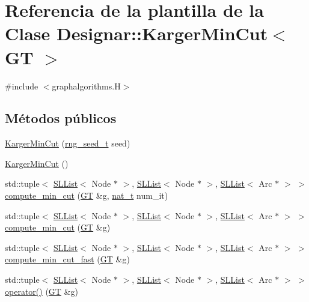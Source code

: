 \hypertarget{class_designar_1_1_karger_min_cut}{}\section{Referencia de la plantilla de la Clase Designar\+:\+:Karger\+Min\+Cut$<$ GT $>$}
\label{class_designar_1_1_karger_min_cut}


{\ttfamily \#include $<$graphalgorithms.\+H$>$}

\subsection*{Métodos públicos}
\begin{DoxyCompactItemize}
\item 
\hyperlink{class_designar_1_1_karger_min_cut_ab2b55a4d8b0d64a469cecafeeac8fcf1}{Karger\+Min\+Cut} (\hyperlink{namespace_designar_ad621b5646d45288c5d6a1e1dfe7531a8}{rng\+\_\+seed\+\_\+t} seed)
\item 
\hyperlink{class_designar_1_1_karger_min_cut_a1f8bce9bd104fb9b6ba7744c58dbf68b}{Karger\+Min\+Cut} ()
\item 
std\+::tuple$<$ \hyperlink{class_designar_1_1_s_l_list}{S\+L\+List}$<$ Node $\ast$ $>$, \hyperlink{class_designar_1_1_s_l_list}{S\+L\+List}$<$ Node $\ast$ $>$, \hyperlink{class_designar_1_1_s_l_list}{S\+L\+List}$<$ Arc $\ast$ $>$ $>$ \hyperlink{class_designar_1_1_karger_min_cut_a62479a7ca1e7202a93cded87a9d09b8b}{compute\+\_\+min\+\_\+cut} (\hyperlink{demo-buildgraph_8_c_a3001c40d2c31ca87ed96cd7d1334a55e}{GT} \&g, \hyperlink{namespace_designar_aa72662848b9f4815e7bf31a7cf3e33d1}{nat\+\_\+t} num\+\_\+it)
\item 
std\+::tuple$<$ \hyperlink{class_designar_1_1_s_l_list}{S\+L\+List}$<$ Node $\ast$ $>$, \hyperlink{class_designar_1_1_s_l_list}{S\+L\+List}$<$ Node $\ast$ $>$, \hyperlink{class_designar_1_1_s_l_list}{S\+L\+List}$<$ Arc $\ast$ $>$ $>$ \hyperlink{class_designar_1_1_karger_min_cut_a7a1a4f9e7895ca7923d4f563d6acf689}{compute\+\_\+min\+\_\+cut} (\hyperlink{demo-buildgraph_8_c_a3001c40d2c31ca87ed96cd7d1334a55e}{GT} \&g)
\item 
std\+::tuple$<$ \hyperlink{class_designar_1_1_s_l_list}{S\+L\+List}$<$ Node $\ast$ $>$, \hyperlink{class_designar_1_1_s_l_list}{S\+L\+List}$<$ Node $\ast$ $>$, \hyperlink{class_designar_1_1_s_l_list}{S\+L\+List}$<$ Arc $\ast$ $>$ $>$ \hyperlink{class_designar_1_1_karger_min_cut_a6c61a57cab52387d2c54e6db0bc58aa9}{compute\+\_\+min\+\_\+cut\+\_\+fast} (\hyperlink{demo-buildgraph_8_c_a3001c40d2c31ca87ed96cd7d1334a55e}{GT} \&g)
\item 
std\+::tuple$<$ \hyperlink{class_designar_1_1_s_l_list}{S\+L\+List}$<$ Node $\ast$ $>$, \hyperlink{class_designar_1_1_s_l_list}{S\+L\+List}$<$ Node $\ast$ $>$, \hyperlink{class_designar_1_1_s_l_list}{S\+L\+List}$<$ Arc $\ast$ $>$ $>$ \hyperlink{class_designar_1_1_karger_min_cut_a733802123d2510126abd4238688432ca}{operator()} (\hyperlink{demo-buildgraph_8_c_a3001c40d2c31ca87ed96cd7d1334a55e}{GT} \&g)
\end{DoxyCompactItemize}


